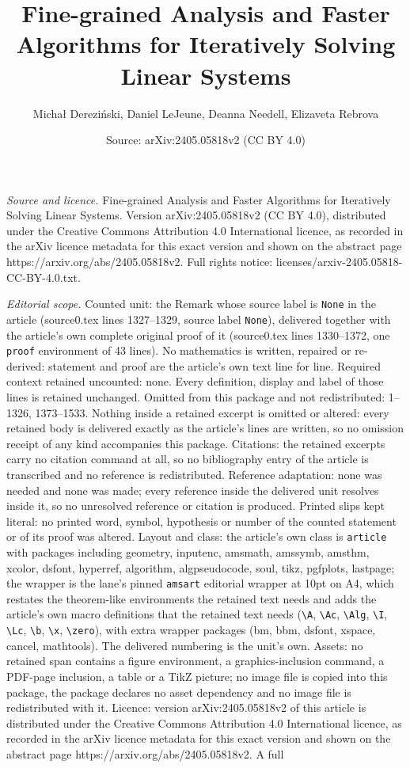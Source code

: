 \documentclass[10pt,a4paper]{amsart}
\title[Fine-grained Analysis and Faster Algorithms for Iteratively ]{Fine-grained Analysis and Faster Algorithms for Iteratively Solving Linear Systems}
\author{Micha{\l} Derezi\'nski, Daniel LeJeune, Deanna Needell, Elizaveta Rebrova}
\date{Source: arXiv:2405.05818v2 (CC BY 4.0)}
\begin{document}
\maketitle

\noindent\emph{Source and licence.} Fine-grained Analysis and Faster Algorithms for Iteratively Solving Linear Systems. Version arXiv:2405.05818v2 (CC BY 4.0), distributed under the Creative Commons Attribution 4.0 International licence, as recorded in the arXiv licence metadata for this exact version and shown on the abstract page https://arxiv.org/abs/2405.05818v2. Full rights notice: licenses/arxiv-2405.05818-CC-BY-4.0.txt.\par\smallskip

\noindent\textit{Editorial scope.} Counted unit: the Remark whose source label is \texttt{None} in the article (source0.tex lines 1327--1329, source label \texttt{None}), delivered together with the article's own complete original proof of it (source0.tex lines 1330--1372, one \texttt{proof} environment of 43 lines). No mathematics is written, repaired or re-derived: statement and proof are the article's own text line for line. Required context retained uncounted: none. Every definition, display and label of those lines is retained unchanged. Omitted from this package and not redistributed: 1--1326, 1373--1533. Nothing inside a retained excerpt is omitted or altered: every retained body is delivered exactly as the article's lines are written, so no omission receipt of any kind accompanies this package. Citations: the retained excerpts carry no citation command at all, so no bibliography entry of the article is transcribed and no reference is redistributed. Reference adaptation: none was needed and none was made; every reference inside the delivered unit resolves inside it, so no unresolved reference or citation is produced. Printed slips kept literal: no printed word, symbol, hypothesis or number of the counted statement or of its proof was altered. Layout and class: the article's own class is \texttt{article} with packages including geometry, inputenc, amsmath, amssymb, amsthm, xcolor, dsfont, hyperref, algorithm, algpseudocode, soul, tikz, pgfplots, lastpage; the wrapper is the lane's pinned \texttt{amsart} editorial wrapper at 10pt on A4, which restates the theorem-like environments the retained text needs and adds the article's own macro definitions that the retained text needs (\texttt{\textbackslash A}, \texttt{\textbackslash Ac}, \texttt{\textbackslash Alg}, \texttt{\textbackslash I}, \texttt{\textbackslash Lc}, \texttt{\textbackslash b}, \texttt{\textbackslash x}, \texttt{\textbackslash zero}), with extra wrapper packages (bm, bbm, dsfont, xspace, cancel, mathtools). The delivered numbering is the unit's own. Assets: no retained span contains a figure environment, a graphics-inclusion command, a PDF-page inclusion, a table or a TikZ picture; no image file is copied into this package, the package declares no asset dependency and no image file is redistributed with it. Licence: version arXiv:2405.05818v2 of this article is distributed under the Creative Commons Attribution 4.0 International licence, as recorded in the arXiv licence metadata for this exact version and shown on the abstract page https://arxiv.org/abs/2405.05818v2. A full 
\end{document}
